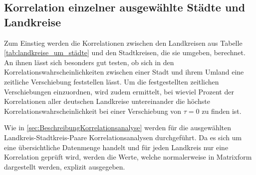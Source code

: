 \subsection{Korrelation einzelner ausgewählte Städte und Landkreise}
Zum Einstieg werden die Korrelationen zwischen den Landkreisen aus Tabelle \ref{tab:landkreise_um_städte} und den Stadtkreisen, die sie umgeben, berechnet. An ihnen lässt sich besonders gut testen, ob sich in den Korrelationswahrscheinlichkeiten zwischen einer Stadt und ihrem Umland eine zeitliche Verschiebung feststellen lässt.
Um die festgestellten zeitlichen Verschiebungen einzuordnen, wird zudem ermittelt, bei wieviel Prozent der Korrelationen aller deutschen Landkreise untereinander die höchste Korrelationswahrscheinlichkeit bei einer Verschiebung von $\tau = 0$ zu finden ist.

Wie in \autoref{sec:BeschreibungKorrelationsanalyse} werden für die ausgewählten Landkreis-Stadtkreis-Paare Korrelationsanalysen durchgeführt. Da es sich um eine übersichtliche Datenmenge handelt und für jeden Landkreis nur eine Korrelation geprüft wird, werden die Werte, welche normalerweise in Matrixform dargestellt werden, explizit ausgegeben.

